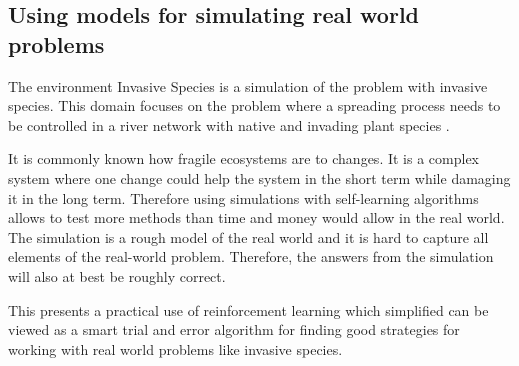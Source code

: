 \subsection{Using models for simulating real world problems}
\label{sec:ethics_inv_spec}


The environment Invasive Species is a simulation of the problem with invasive
species. This domain
focuses on the problem where a spreading process needs to be controlled in a
river network with native and invading plant species
\parencite{invasiveSpecis2014:Online}. 

It is commonly known how fragile ecosystems are to changes. It is a complex
system where one change could help the system in the short term while damaging it in the long
term. Therefore using simulations with self-learning algorithms allows to test
more methods than time and money would allow in the real world. The simulation is a rough model
of the real world and it is hard to capture all elements of the real-world
problem. Therefore, the answers from the simulation will also at best be roughly
correct.

This presents a practical use of reinforcement learning which simplified can be
viewed as a smart trial and error algorithm for finding good strategies for
working with real world problems like invasive species.
